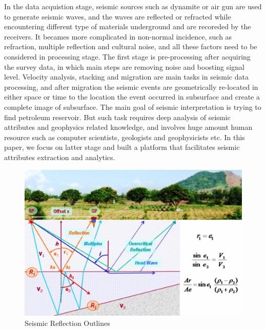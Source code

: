 In the data acquistion stage, seismic sources such as dynamite or air gun are used to generate seismic waves, and the waves are reflected or refracted while encountering different type of materials underground and are recoreded by the receivers. It becames more complicated in non-normal incidence, such as refraction, multiple reflection and cultural noise, and all these factors need to be considered in processing stage. The first stage is pre-processing after acquiring the survey data, in which main steps are removing noise and boosting signal level. Velocity analysis, stacking and migration are main tasks in seismic data processing, and after migration the seismic events are geometrically re-located in either space or time to the location the event occurred in subsurface and create a complete image of subsurface\cite{seisreflection}. The main goal of seismic interpretation is trying to find petroleum reservoir. But such task requires deep analysis of seismic attributes and geophysics related knowledge, and involves huge amount human resource such as computer scientists, geologists and geophysicists etc. In this paper, we focus on latter stage and built a platform that facilitates seismic attributes extraction and analytics.   

\begin{figure}[h]
\centering
\includegraphics[scale=1]{figures/seismic_reflection_principal.png}
\caption{Seismic Reflection Outlines\cite{seisreflection}}
\label{seismic_reflection}
\end{figure}



